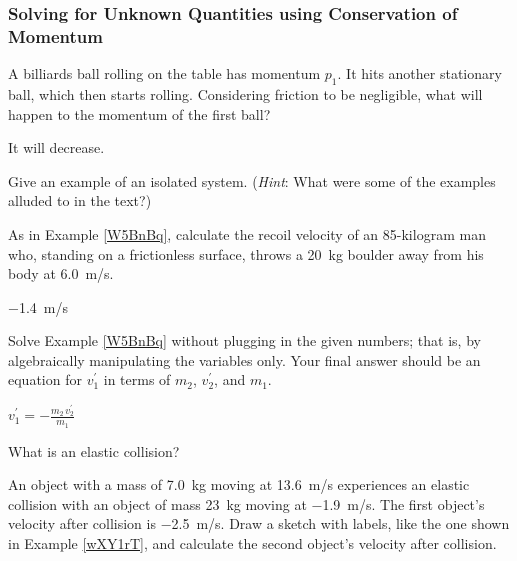 \documentclass[../main-physics-problems.tex]{subfiles}
\begin{document}
\subsubsection{Solving for Unknown Quantities using Conservation of Momentum}


\begin{questions}



\question \label{yEzMEO}
A billiards ball rolling on the table has momentum $p_1$. It hits another stationary ball, which then starts rolling. Considering friction to be negligible, what will happen to the momentum of the first ball?

\begin{solution}
It will decrease.
\end{solution}

\question
Give an example of an isolated system. (\textit{Hint}: What were some of the examples alluded to in the text?)


\question \label{Fl5xyW}
As in Example \ref{W5BnBq}, calculate the recoil velocity of an 85-kilogram man who, standing on a frictionless surface, throws a \SI{20}{kg} boulder away from his body at \SI{6.0}{m/s}.

\begin{solution}
\SI{-1.4}{m/s}
\end{solution}


\question \label{dMW612}
Solve Example \ref{W5BnBq} without plugging in the given numbers; that is, by algebraically manipulating the variables only. Your final answer should be an equation for $v_1^{\prime}$ in terms of $m_2$, $v_2^{\prime}$, and $m_1$.

\begin{solution}
$v_1^{\prime} = -\frac{m_2\,v_2^{\prime}}{m_1}$
\end{solution}

\question \label{rhrGbz}
What is an elastic collision?


% 

\question\label{bTj1d8} %
An object with a mass of \SI{7.0}{kg} moving at \SI{13.6}{m/s} experiences an elastic collision with an object of mass \SI{23}{kg} moving at \SI{-1.9}{m/s}. The first object's velocity after collision is \SI{-2.5}{m/s}. Draw a sketch with labels, like the one shown in Example \ref{wXY1rT}, and calculate the second object's velocity after collision.


\end{questions}
\end{document}
